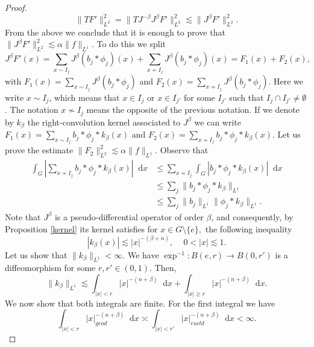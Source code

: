 \documentclass[12pt, reqno]{amsart}
\theoremstyle{definition}
\theoremstyle{remark}
\numberwithin{equation}{section}
\newcommand*\diff{\mathop{}\!\mathrm{d}}
\begin{document}
\begin{proof}
\begin{equation*}
    \|TF'\|^{2}_{L^2}=\|TJ^{-\beta}J^\beta F'\|^{2}_{L^2}\lesssim\|J^\beta F'\|^{2}_{L^2}.
\end{equation*}
From the above we conclude that it is enough to prove that $\|J^\beta F'\|^{2}_{L^2}\lesssim\alpha\|f\|_{L^1}$. To do this we split
\begin{equation*}
    J^\beta F'(x)=\sum_{x\sim I_j}J^\beta(b_j*\phi_j)(x)+\sum_{x\not\sim I_j}J^\beta(b_j*\phi_j)(x)=F_1(x)+F_2(x),
\end{equation*}
with $F_1(x)=\sum_{x\sim I_j}J^\beta(b_j*\phi_j)$ and $F_2(x)=\sum_{x\not\sim I_j}J^\beta(b_j*\phi_j)$. Here we write $x\sim I_j$, which means that $x\in I_j$ or $x\in I_{j'}$ for some $I_{j'}$ such that  $I_j\cap I_{j'}\neq\emptyset$. The notation $x\not\sim I_j$ means the opposite of the previous notation. If we denote by $k_\beta$ the right-convolution kernel associated to $J^\beta$ we can write $F_1(x)=\sum_{x\sim I_j}b_j*\phi_j*k_\beta(x)$ and $F_2(x)=\sum_{x\not\sim I_j}b_j*\phi_j*k_\beta(x)$. Let us prove the estimate $\|F_2\|^2_{L^2}\lesssim\alpha\|f\|_{L^1}$. Observe that
\begin{equation*}
\begin{aligned}
    \int_{G}|\sum_{x\not\sim I_j}b_j*\phi_j*k_\beta(x)|\diff{x}&\leq\sum_{x\not\sim I_j}\int_{G}|b_j*\phi_j*k_\beta(x)|\diff{x}\\
    &\leq\sum_{j}\|b_j*\phi_j*k_\beta\|_{L^1}\\
    &\leq\sum_{j}\|b_j\|_{L^1}\|\phi_j*k_\beta\|_{L^1}.
\end{aligned}
\end{equation*}
Note that $J^\beta$ is a pseudo-differential operator of order $\beta$, and consequently, by Proposition \ref{kernel} its kernel satisfies for $x\in G\setminus\{e\},$ the following inequality
\begin{equation*}
    |k_\beta(x)|\lesssim|x|^{-(\beta+n)},\,\quad 0<|x|\lesssim1.
\end{equation*} 
Let us show that $\|k_\beta\|_{L^1}<\infty$. We have $\exp^{-1}\colon B(e,r)\to B(0,r')$ is a diffeomorphism for some $r,r'\in(0,1)$. Then,
\begin{equation*}
    \|k_\beta\|_{L^1}\lesssim\int_{|x|<r}|x|^{-(n+\beta)}\diff{x}+\int_{|x|\geq r}|x|^{-(n+\beta)}\diff{x}.
\end{equation*}
We now show that both integrals are finite. For the first integral we have
\begin{equation*}
    \int_{|x|<r}|x|_{geod}^{-(n+\beta)}\diff{x}\asymp\int_{|x|<r'}|x|^{-(n+\beta)}_{eucld}\diff{x}<\infty.

\end{equation*}
\end{proof}
\end{document}
